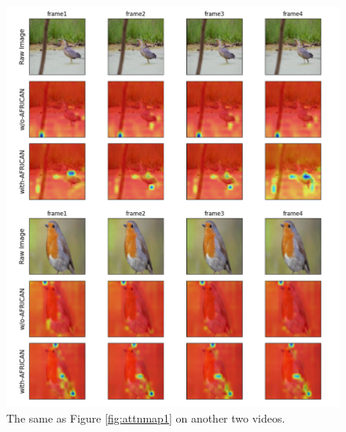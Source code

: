 \begin{figure}[ht]
    \centering
    \includegraphics[width=1.0\textwidth]{assets/charts/4_5_AttentionMaps_3}
    \caption[Attention Map 3 (Good examples)]{The same as Figure \ref{fig:attnmap1} on another two videos.}
    \label{fig:attnmap3}
\end{figure}

